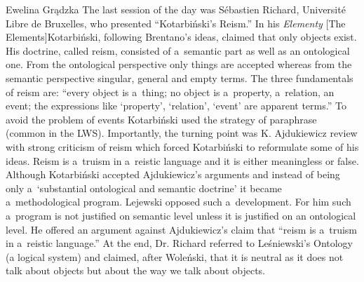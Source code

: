 \begin{editorialeng}{Ewelina Grądzka}
The last session of the day was Sébastien Richard, Université Libre de Bruxelles, who presented ``Kotarbiński’s Reism.'' In his \textit{Elementy} [The Elements]Kotarbiński, following Brentano’s ideas, claimed that only objects exist. His doctrine, called reism, consisted of a~semantic part as well as an ontological one. From the ontological perspective only things are accepted whereas from the semantic perspective singular, general and empty terms. The three fundamentals of reism are: ``every object is a~thing; no object is a~property, a~relation, an event; the expressions like ‘property’, ‘relation’, ‘event’ are apparent terms.'' To avoid the problem of events Kotarbiński used the strategy of paraphrase (common in the LWS). Importantly, the turning point was K. Ajdukiewicz review with strong criticism of reism which forced Kotarbiński to reformulate some of his ideas. Reism is a~truism in a~reistic language and it is either meaningless or false. Although Kotarbiński accepted Ajdukiewicz’s arguments and instead of being only a~‘substantial ontological and semantic doctrine’ it became a~methodological program. Lejewski opposed such a~development. For him such a~program is not justified on semantic level unless it is justified on an ontological level. He offered an argument against Ajdukiewicz’s claim that ``reism is a~truism in a~reistic language.'' At the end, Dr. Richard referred to Leśniewski’s Ontology (a logical system) and claimed, after Woleński, that it is neutral as it does not talk about objects but about the way we talk about objects.


\end{editorialeng}
